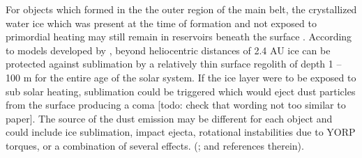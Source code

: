 \documentclass[iop,apj]{emulateapj}
\begin{document}

For objects which formed in the the outer region of the main belt, the crystallized water ice which was present at the time of formation and not exposed to primordial heating may still remain in reservoirs beneath the surface \citep{prialnik09}.  According to models developed by \citet*{fanale89},  beyond heliocentric distances of 2.4 AU ice can be protected against sublimation by a relatively thin surface regolith  of depth 1 -- 100 m for the entire age of the solar system. If the ice layer were to be exposed to sub solar heating,  sublimation could be triggered which would  eject dust particles from the surface producing a coma [todo: check that wording not too similar to paper]. The source of the dust emission may be different for each object and could include ice sublimation, impact ejecta, rotational instabilities due to YORP torques, or a combination of several effects. (\cite{hsieh15}; and references therein).  

\end{document}
